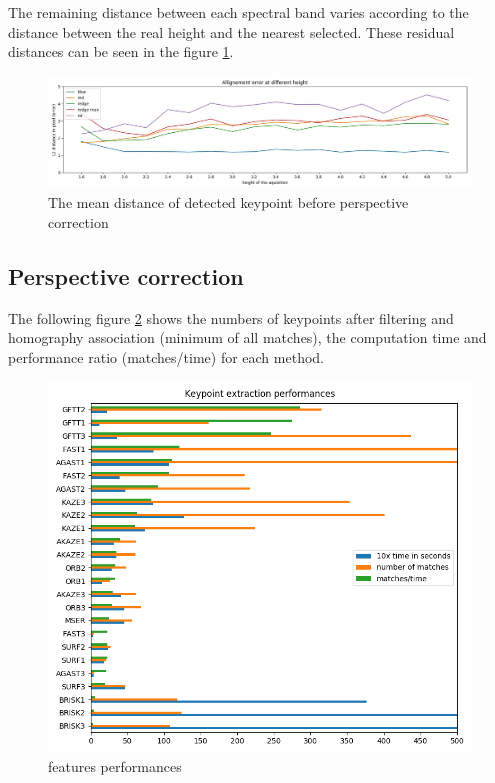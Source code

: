 \documentclass[]{elsarticle}
\begin{document}
	The remaining distance between each spectral band varies according to the distance between the real height and the nearest selected.
	These residual distances can be seen in the figure \ref{fig:affine-error}.
	
	\begin{figure}[!htb]
	\centering
		\includegraphics[width=\linewidth]{../figures/affine-allignement-rmse.jpg}
		\caption{The mean distance of detected keypoint before perspective correction}
		\label{fig:affine-error}
	\end{figure}
	
	
	\newpage
	\subsection{Perspective correction}
	
	The following figure \ref{fig:features-performances} shows the numbers of keypoints after filtering and homography association (minimum of all matches),
	the computation time and performance ratio (matches/time) for each method.
	
	\begin{figure}[!htb]
		\centering
		\includegraphics[width=\linewidth]{../figures/comparaison-keypoint-performances.png}
		\caption{features performances}
		\label{fig:features-performances}
	\end{figure}
	
\end{document}
